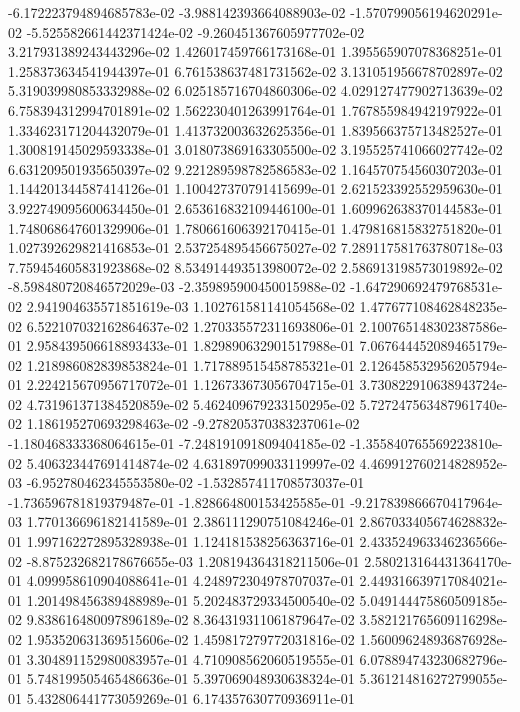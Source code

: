 -6.172223794894685783e-02
-3.988142393664088903e-02
-1.570799056194620291e-02
-5.525582661442371424e-02
-9.260451367605977702e-02
3.217931389243443296e-02
1.426017459766173168e-01
1.395565907078368251e-01
1.258373634541944397e-01
6.761538637481731562e-02
3.131051956678702897e-02
5.319039980853332988e-02
6.025185716704860306e-02
4.029127477902713639e-02
6.758394312994701891e-02
1.562230401263991764e-01
1.767855984942197922e-01
1.334623171204432079e-01
1.413732003632625356e-01
1.839566375713482527e-01
1.300819145029593338e-01
3.018073869163305500e-02
3.195525741066027742e-02
6.631209501935650397e-02
9.221289598782586583e-02
1.164570754560307203e-01
1.144201344587414126e-01
1.100427370791415699e-01
2.621523392552959630e-01
3.922749095600634450e-01
2.653616832109446100e-01
1.609962638370144583e-01
1.748068647601329906e-01
1.780661606392170415e-01
1.479816815832751820e-01
1.027392629821416853e-01
2.537254895456675027e-02
7.289117581763780718e-03
7.759454605831923868e-02
8.534914493513980072e-02
2.586913198573019892e-02
-8.598480720846572029e-03
-2.359895900450015988e-02
-1.647290692479768531e-02
2.941904635571851619e-03
1.102761581141054568e-02
1.477677108462848235e-02
6.522107032162864637e-02
1.270335572311693806e-01
2.100765148302387586e-01
2.958439506618893433e-01
1.829890632901517988e-01
7.067644452089465179e-02
1.218986082839853824e-01
1.717889515458785321e-01
2.126458532956205794e-01
2.224215670956717072e-01
1.126733673056704715e-01
3.730822910638943724e-02
4.731961371384520859e-02
5.462409679233150295e-02
5.727247563487961740e-02
1.186195270693298463e-02
-9.278205370383237061e-02
-1.180468333368064615e-01
-7.248191091809404185e-02
-1.355840765569223810e-02
5.406323447691414874e-02
4.631897099033119997e-02
4.469912760214828952e-03
-6.952780462345553580e-02
-1.532857411708573037e-01
-1.736596781819379487e-01
-1.828664800153425585e-01
-9.217839866670417964e-03
1.770136696182141589e-01
2.386111290751084246e-01
2.867033405674628832e-01
1.997162272895328938e-01
1.124181538256363716e-01
2.433524963346236566e-02
-8.875232682178676655e-03
1.208194364318211506e-01
2.580213164431364170e-01
4.099958610904088641e-01
4.248972304978707037e-01
2.449316639717084021e-01
1.201498456389488989e-01
5.202483729334500540e-02
5.049144475860509185e-02
9.838616480097896189e-02
8.364319311061879647e-02
3.582121765609116298e-02
1.953520631369515606e-02
1.459817279772031816e-02
1.560096248936876928e-01
3.304891152980083957e-01
4.710908562060519555e-01
6.078894743230682796e-01
5.748199505465486636e-01
5.397069048930638324e-01
5.361214816272799055e-01
5.432806441773059269e-01
6.174357630770936911e-01
